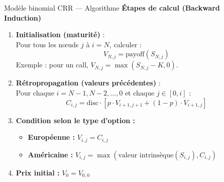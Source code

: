 \documentclass[aspectratio=169]{beamer}
\begin{document}
\begin{frame}{Modèle binomial CRR — Algorithme}
  \small
  \textbf{Étapes de calcul (Backward Induction)}
  \begin{enumerate}\scriptsize
    \item \textbf{Initialisation (maturité)} :\\
    Pour tous les nœuds $j$ à $i = N$, calculer :
    \[
      V_{N,j} = \text{payoff}(S_{N,j})
    \]
    Exemple : pour un call, $V_{N,j} = \max(S_{N,j} - K, 0)$.
    
    \vspace{2mm}
    \item \textbf{Rétropropagation (valeurs précédentes)} :\\
    Pour chaque $i = N-1, N-2, \ldots, 0$ et chaque $j \in [0, i]$ :
    \[
      C_{i,j} = \text{disc} \cdot [p \cdot V_{i+1,j+1} + (1-p) \cdot V_{i+1,j}]
    \]
    
    \vspace{2mm}
    \item \textbf{Condition selon le type d’option :}
    \begin{itemize}
      \item \textbf{Européenne :} $V_{i,j} = C_{i,j}$
      \item \textbf{Américaine :} $V_{i,j} = \max(\text{valeur intrinsèque}(S_{i,j}), C_{i,j})$
    \end{itemize}
    
    \vspace{2mm}
    \item \textbf{Prix initial :} $V_0 = V_{0,0}$
  \end{enumerate}
\end{frame}
\end{document}
